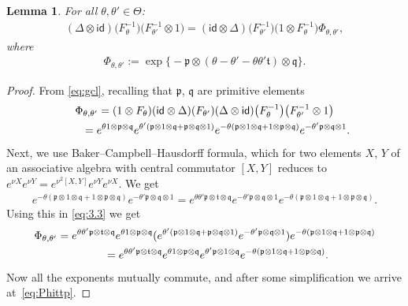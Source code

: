 \documentclass[10pt,a4paper]{amsart}
\numberwithin{equation}{section}
\newtheorem{lem}[thm]{Lemma}
\theoremstyle{definition}
\newcommand{\id}{\mathsf{id}}
\newcommand{\mf}{\mathfrak}
\newcommand{\ga}{\mf{p}}
\newcommand{\gb}{\mf{q}}
\newcommand{\gc}{\mf{t}}
\renewcommand{\hbar}{\nu}
\begin{document}
\begin{lem}\label{gcl}
For all $\theta,\theta'\in\Theta$:
\begin{gather}\label{eq:gcl}
(\Delta\otimes\id)\big(F_\theta^{-1}\big)\big(F_{\theta'}^{-1}\otimes 1\big)
=(\id\otimes\Delta)\big(F_{\theta'}^{-1}\big)\big(1\otimes F_\theta^{-1}\big)\Phi_{\theta,\theta'},
\end{gather}
where
\begin{gather}\label{eq:Phittp}
\Phi_{\theta,\theta'}:=\exp\big\{{-}\ga\otimes\left(\theta-\theta'-\theta\theta' \gc\right)\otimes\gb\big\} .
\end{gather}
\end{lem}

\begin{proof}
From \eqref{eq:gcl}, recalling that $\ga$, $\gb$ are primitive elements
\begin{gather}
\Phi_{\theta,\theta'} =
(1\otimes F_\theta)
(\id\otimes\Delta)(F_{\theta'})(\Delta\otimes\id)\big(F_\theta^{-1}\big)\big(F_{\theta'}^{-1}\otimes 1\big) \nonumber \\
\hphantom{\Phi_{\theta,\theta'} }{}
=e^{\theta 1\otimes \ga\otimes\gb}
e^{\theta'( \ga\otimes 1\otimes\gb+\ga\otimes\gb\otimes 1 )}
e^{-\theta ( \ga\otimes 1\otimes\gb+1\otimes\ga\otimes\gb)}
e^{-\theta' \ga\otimes\gb\otimes 1} . \label{eq:3.3}
\end{gather}
Next, we use Baker--Campbell--Hausdorf\/f formula, which for two elements $X$, $Y$ of an associative algebra with central commutator $[X,Y]$ reduces to $e^{\hbar X}e^{\hbar Y}=e^{\hbar^2[X,Y]}e^{\hbar Y}e^{\hbar X}$. We get
\begin{gather*}
e^{-\theta ( \ga\otimes 1\otimes\gb+1\otimes\ga\otimes\gb)}
e^{-\theta' \ga\otimes\gb\otimes 1}=
e^{\theta\theta' \ga\otimes\gc\otimes\gb}
e^{-\theta' \ga\otimes\gb\otimes 1}
e^{-\theta ( \ga\otimes 1\otimes\gb+1\otimes\ga\otimes\gb)} .
\end{gather*}
Using this in \eqref{eq:3.3} we get
\begin{gather*}
\Phi_{\theta,\theta'} =
e^{\theta\theta' \ga\otimes\gc\otimes\gb}
e^{\theta 1\otimes \ga\otimes\gb}
 (e^{\theta'( \ga\otimes 1\otimes\gb+\ga\otimes\gb\otimes 1 )}
e^{-\theta' \ga\otimes\gb\otimes 1})
e^{-\theta ( \ga\otimes 1\otimes\gb+1\otimes\ga\otimes\gb)} \\
\hphantom{\Phi_{\theta,\theta'} }{}
=e^{\theta\theta' \ga\otimes\gc\otimes\gb}
e^{\theta 1\otimes \ga\otimes\gb}
e^{\theta' \ga\otimes 1\otimes \gb}
e^{-\theta ( \ga\otimes 1\otimes\gb+1\otimes\ga\otimes\gb)} .
\end{gather*}
Now all the exponents mutually commute, and after some simplif\/ication we arrive at~\eqref{eq:Phittp}.
\end{proof}
\end{document}
